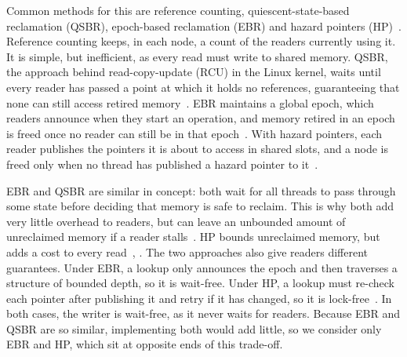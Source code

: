 \documentclass[11pt,a4paper,oneside]{report}
\begin{document}
Common methods for this are reference counting, quiescent-state-based
reclamation (QSBR), epoch-based reclamation (EBR) and hazard pointers
(HP)~\cite{hart2007}. Reference counting keeps, in each node, a count of the
readers currently using it. It is simple, but inefficient, as every read must
write to shared memory. QSBR, the approach behind read-copy-update (RCU) in the
Linux kernel, waits until every reader has passed a point at which it holds no
references, guaranteeing that none can still access retired
memory~\cite{mckenney1998}. EBR maintains a global epoch, which readers announce
when they start an operation, and memory retired in an epoch is freed once no
reader can still be in that epoch~\cite{fraser2004}. With hazard pointers, each
reader publishes the pointers it is about to access in shared slots, and a node
is freed only when no thread has published a hazard pointer to
it~\cite{michael2004}.

EBR and QSBR are similar in concept: both wait for all threads to pass through
some state before deciding that memory is safe to reclaim. This is why both add
very little overhead to readers, but can leave an unbounded amount of
unreclaimed memory if a reader stalls~\cite{hart2007}. HP bounds unreclaimed
memory, but adds a cost to every read~\cite{hart2007}, \cite{michael2004}. The
two approaches also give readers different guarantees. Under EBR, a lookup only
announces the epoch and then traverses a structure of bounded depth, so it is
wait-free. Under HP, a lookup must re-check each pointer after publishing it and
retry if it has changed, so it is lock-free~\cite{michael2004}. In both cases,
the writer is wait-free, as it never waits for readers. Because EBR and QSBR are
so similar, implementing both would add little, so we consider only EBR and HP,
which sit at opposite ends of this trade-off.
\end{document}
